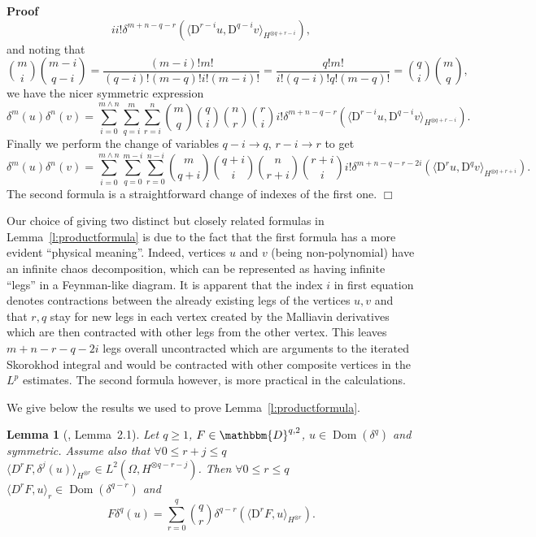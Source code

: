 \documentclass[a4paper,11pt]{article}
\newcommand{\mathD}{\mathrm{D}}
\newcommand{\tmop}[1]{\ensuremath{\operatorname{#1}}}
\newenvironment{proof}{\noindent\textbf{Proof\ }}{\hspace*{\fill}$\Box$\medskip}
\newtheorem{lemma}[theorem]{Lemma}
{\theorembodyfont{\rmfamily}\newtheorem{remark}[theorem]{Remark}}
\begin{document}
\begin{proof}
\[{     i} i! \delta^{m + n - q - r} (\langle \mathD^{r - i} u, \mathD^{q - i} v
     \rangle_{H^{\otimes q + r - i}}), \]
  and noting that
  \[ \  \]
  \[ \binom{m}{i} \binom{m - i}{q - i} = \frac{(m - i) !m!}{(q - i) ! (m - q)
     !i! (m - i) !} = \frac{q!m!}{i! (q - i) !q! (m - q) !} = \binom{q}{i}
     \binom{m}{q}, \]
  we have the nicer symmetric expression
  \[ \delta^m (u) \delta^n (v) = \sum^{m \wedge n}_{i = 0} \sum_{q = i}^m
     \sum_{r = i}^n \binom{m}{q} \binom{q}{i} \binom{n}{r} \binom{r}{i} i!
     \delta^{m + n - q - r} (\langle \mathD^{r - i} u, \mathD^{q - i} v
     \rangle_{H^{\otimes q + r - i}}) . \]
  \[ \  \]
  Finally we perform the change of variables $q - i \rightarrow q$, $r - i
  \rightarrow r$ to get
  \[ \delta^m (u) \delta^n (v) = \sum^{m \wedge n}_{i = 0} \sum_{q = 0}^{m -
     i} \sum_{r = 0}^{n - i} \binom{m}{q + i} \binom{q + i}{i} \binom{n}{r +
     i} \binom{r + i}{i} i! \delta^{m + n - q - r - 2 i} (\langle \mathD^r u,
     \mathD^q v \rangle_{H^{\otimes q + r + i}}) . \]
  The second formula is a straightforward change of indexes of the first one.
\end{proof}

\begin{remark}
  Our choice of giving two distinct but closely related formulas in
  Lemma~\ref{l:productformula} is due to the fact that the first formula has a
  more evident ``physical meaning''. Indeed, vertices $u$ and $v$ (being
  non-polynomial) have an infinite chaos decomposition, which can be
  represented as having infinite ``legs'' in a Feynman-like diagram. It is
  apparent that the index $i$ in first equation denotes contractions between
  the already existing legs of the vertices $u, v$ and that $r, q$ stay for
  new legs in each vertex created by the Malliavin derivatives which are then
  contracted with other legs from the other vertex. This leaves $m + n - r - q
  - 2 i$ legs overall uncontracted which are arguments to the iterated
  Skorokhod integral and would be contracted with other composite vertices in
  the $L^p$ estimates. The second formula however, is more practical in the
  calculations.
\end{remark}

We give below the results we used to prove Lemma~\ref{l:productformula}.

\begin{lemma}[{\cite{nourdin_nualart_2007}}, Lemma~2.1]
  \label{l:lemma-nourdin}Let $q \geqslant 1$, $F \in \mathbbm{D}^{q, 2}$, $u
  \in \tmop{Dom} (\delta^q)$ and symmetric. Assume also that $\forall 0
  \leqslant r + j \leqslant q$ $\langle D^r F, \delta^j (u)
  \rangle_{H^{\otimes r}} \in L^2 (\Omega, H^{\otimes q - r - j})$. Then
  $\forall 0 \leqslant r \leqslant q$ $\langle D^r F, u \rangle_r \in
  \tmop{Dom} (\delta^{q - r})$ and
  \[ F \delta^q (u) = \sum_{r = 0}^q \binom{q}{r} \delta^{q - r} (\langle
     \mathD^r F, u \rangle_{H^{\otimes r}}) . \]
\end{lemma}
\end{document}
